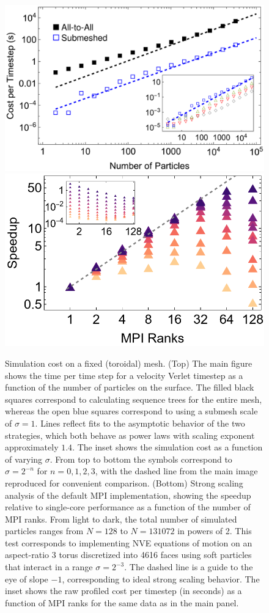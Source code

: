 \documentclass[preprint,12pt]{elsarticle}
\newcounter{bla}
\begin{document}
\begin{figure}[th!]
    \includegraphics[width=\columnwidth]{pretty_cvn_8_27_fitted.pdf}
    \includegraphics[width=\columnwidth]{strongscaling.png}
    \caption{Simulation cost on a fixed (toroidal) mesh. (Top) The main figure shows the time per time step for a velocity Verlet timestep as a function of the number of particles on the surface. The filled  black squares correspond to calculating sequence trees for the entire mesh, whereas the open blue squares correspond to using a submesh scale of $\sigma=1$. Lines reflect fits to the asymptotic behavior of the two strategies, which both behave as power laws with scaling exponent approximately $1.4$. The inset shows the simulation cost as a function of varying $\sigma$. From top to bottom the symbols correspond to $\sigma = 2^{-n}$ for $n=0,1,2,3$, with the dashed line from the main image reproduced for convenient comparison. (Bottom) Strong scaling analysis of the default MPI implementation, showing the speedup relative to single-core performance as a function of the number of MPI ranks. From light to dark, the total number of simulated particles ranges from $N=128$ to $N=131072$ in powers of 2. This test corresponds to implementing NVE equations of motion on an aspect-ratio 3 torus discretized into 4616 faces using soft particles that interact in a range $\sigma=2^{-3}$. The dashed line is a guide to the eye of slope $-1$, corresponding to ideal strong scaling behavior. The inset shows the raw profiled cost per timestep (in seconds) as a function of MPI ranks for the same data as in the main panel.}

\end{figure}
\end{document}
